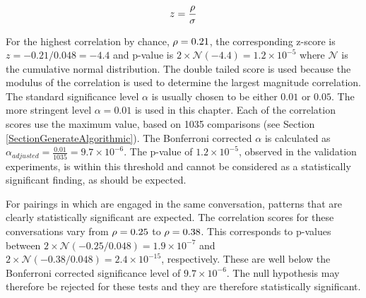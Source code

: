 \begin{gather}
z = \frac{\rho}{\sigma}
\end{gather}

For the highest correlation by chance, $\rho=0.21$, the corresponding z-score is $z=-0.21/0.048=−4.4$ and p-value is $2\times\mathcal{N}(−4.4)=1.2\times10^{-5}$ where $\mathcal{N}$ is the cumulative normal distribution. The double tailed score is used because the modulus of the correlation is used to determine the largest magnitude correlation. The standard significance level $\alpha$ is usually chosen to be either $0.01$ or $0.05$. The more stringent level $\alpha=0.01$ is used in this chapter. Each of the correlation scores use the maximum value, based on 1035 comparisons (see Section \ref{SectionGenerateAlgorithmic}). The Bonferroni corrected $\alpha$ is calculated as $\alpha_{adjusted} = \frac{0.01}{1035}=9.7\times10^{-6}$. The p-value of $1.2\times10^{-5}$, observed in the validation experiments, is within this threshold and cannot be considered as a statistically significant finding, as should be expected. 

For pairings in which are engaged in the same conversation, patterns that are clearly statistically significant are expected. The correlation scores for these conversations vary from $\rho=0.25$ to $\rho=0.38$. This corresponds to p-values between $2\times\mathcal{N}(-0.25/0.048)=1.9\times10^{-7}$ and $2\times\mathcal{N}(-0.38/0.048)=2.4\times10^{-15}$, respectively. These are well below the Bonferroni corrected significance level of $9.7\times10^{-6}$. The null hypothesis may therefore be rejected for these tests and they are therefore statistically significant.

